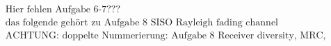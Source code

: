 \documentclass[fleqn]{article}
\begin{document}







\begin{align*}
&\text{Hier fehlen Aufgabe 6-7???}& \\
&\text{das folgende gehört zu Aufgabe 8 SISO Rayleigh fading channel}& \\
&\text{ACHTUNG: doppelte Nummerierung: Aufgabe 8 Receiver diversity, MRC, EGC and SC}&
\end{align*}





\end{document}
